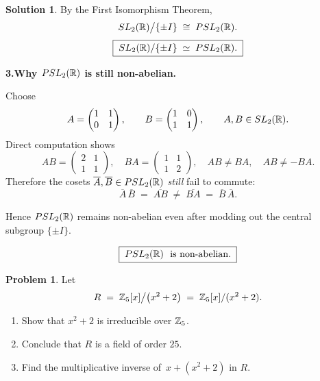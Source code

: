 \documentclass[12pt]{article}
\theoremstyle{definition} %
\newtheorem{solution}{Solution}
\newtheorem{problem}{Problem}
\theoremstyle{plain} %
\begin{document}
\begin{solution}
            By the First Isomorphism Theorem,
            \[
               SL_{2}(\Bbb R)\big/\{\pm I\}
                  \;\cong\;
               PSL_{2}(\Bbb R).
            \]
            \[
               \boxed{\;SL_{2}(\Bbb R)/\{\pm I\}\;\simeq\;PSL_{2}(\Bbb R).\;}
            \]
            
            \bigskip
            \textbf{3.\;Why \(PSL_{2}(\Bbb R)\) is still non-abelian.}
            
            Choose
            \[
               A=\begin{pmatrix}1&1\\0&1\end{pmatrix},
               \qquad
               B=\begin{pmatrix}1&0\\1&1\end{pmatrix},
               \qquad
               A,B\in SL_{2}(\Bbb R).
            \]
            Direct computation shows
            \[
               AB=\begin{pmatrix}2&1\\1&1\end{pmatrix},
               \quad
               BA=\begin{pmatrix}1&1\\1&2\end{pmatrix},
               \quad
               AB\neq BA,
               \quad
               AB\neq -BA.
            \]
            Therefore the cosets \(\overline{A},\overline{B}\in PSL_{2}(\Bbb R)\)
            \emph{still} fail to commute:
            \[
               \overline{A}\,\overline{B}\;=\;\overline{AB}
               \;\neq\;\overline{BA}\;=\;\overline{B}\,\overline{A}.
            \]
            
            Hence \(PSL_{2}(\Bbb R)\) remains non-abelian even after modding out the
            central subgroup \(\{\pm I\}\).
            
            \[
               \boxed{\;PSL_{2}(\Bbb R)\ \text{ is non-abelian.}\;}
            \]
            \end{solution}
            \begin{problem}
              Let  
              \[
                 R \;=\; \Bbb Z_{5}[x]\big/\bigl(x^{2}+2\bigr)
                        \;=\;
                 \Bbb Z_{5}[x]/(x^{2}+2).
              \]
              \begin{enumerate}[]
                 \item Show that \(x^{2}+2\) is irreducible over \(\Bbb Z_{5}\).
                 \item Conclude that \(R\) is a field of order \(25\).
                 \item Find the multiplicative inverse of \(\,x+(x^{2}+2)\) in \(R\).
              \end{enumerate}
              \end{problem}
              
\end{document}
